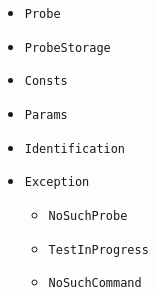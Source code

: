 \documentclass[a4paper,11pt]{article}
\newcommand{\cd}[1]{\texttt{#1}}
\begin{document}
\begin{itemize}
\item \cd{Probe}
\item \cd{ProbeStorage}
\item \cd{Consts}
\item \cd{Params}
\item \cd{Identification}

\item \cd{Exception}
	\begin{itemize}
	\item \cd{NoSuchProbe}
	\item \cd{TestInProgress}
	\item \cd{NoSuchCommand}
	\end{itemize}
\end{itemize}









\end{document}
